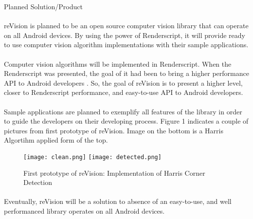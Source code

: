 \documentclass[12pt, a4paper]{article} \pagenumbering{gobble}
\begin{document}
\begin{section}{Planned Solution/Product}
  \paragraph{}{
  reVision is planned to be an open source computer vision library that can operate on all Android devices.
  By using the power of Renderscript, it will provide ready to use computer vision algorithm implementations
  with their sample applications.
  }
  \paragraph{}{
  Computer vision algorithms will be implemented in Renderscript. When the Renderscript was presented, the goal of
  it had been to bring a higher performance API to Android developers \cite{renderscript_release}.
  So, the goal of reVision is to present a higher level, closer to Renderscript performance, and easy-to-use
  API to Android developers.
  }
  \paragraph{}{
  Sample applications are planned to exemplify all features of the library in order to guide the developers on
  their developing process. Figure 1 indicates a couple of pictures from first prototype of reVision. Image on the
  bottom is a Harris Algortihm applied form of the top.

  }
  \begin{figure}[h]
    \centering
    \texttt{[image: clean.png]}
    \texttt{[image: detected.png]}

    \caption{First prototype of reVision: Implementation of Harris Corner Detection}
    \label{fig:mesh1}
  \end{figure}


  \paragraph{}{
  Eventually, reVision will be a solution to absence of an easy-to-use, and well performanced library operates on
  all Android devices.
  }

\end{section}
\newpage
\end{document}
